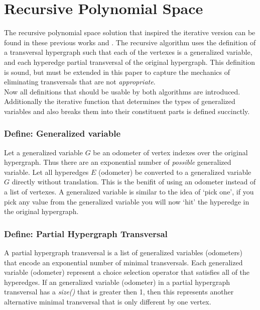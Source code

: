 \chapter{Recursive Polynomial Space}

The recursive polynomial space solution that inspired the iterative version can be found in these previous works \cite{kavvadias1999evaluation} and \cite{kavvadias2005efficient}. The recursive algorithm uses the definition of a transversal hypergraph such that each of the vertexes is a generalized variable, and each hyperedge partial transversal of the original hypergraph. This definition is sound, but must be extended in this paper to capture the mechanics of eliminating transversals that are not \textit{appropriate}.\\

Now all definitions that should be usable by both algorithms are introduced. Additionally the iterative function that determines the types of generalized variables and also breaks them into their constituent parts is defined succinctly.\\

\subsection{Define: Generalized variable}
Let a generalized variable $G$ be an odometer of vertex indexes over the original hypergraph. Thus there are an exponential number of \textit{possible} generalized variable. Let all hyperedges $E$ (odometer) be converted to a generalized variable $G$ directly without translation. This is the benifit of using an odometer instead of a list of vertexes. A generalized variable is similar to the idea of `pick one', if you pick any value from the generalized variable you will now `hit' the hyperedge in the original hypergraph. \\

\subsection{Define: Partial Hypergraph Transversal}
A partial hypergraph transversal is a list of generalized variables (odometers) that encode an exponential number of minimal transversals. Each generalized variable (odometer) represent a choice selection operator that satisfies all of the hyperedges. If an generalized variable (odometer) in a partial hypergraph transversal has a \textit{size()} that is greater then 1, then this represents another alternative minimal transversal that is only different by one vertex.\\ 

